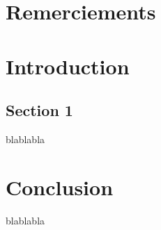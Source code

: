 \documentclass[french]{spimufchdr}
\begin{document}
 

\chapter*{Remerciements}

\tableofcontents
 
\mainmatter

\chapter{Introduction}
 
\section{Section 1}
 
blablabla
 
\chapter{Conclusion}
 
blablabla
 
\backmatter

 
%
\listoffigures
\listoftables
 
 
\end{document}
